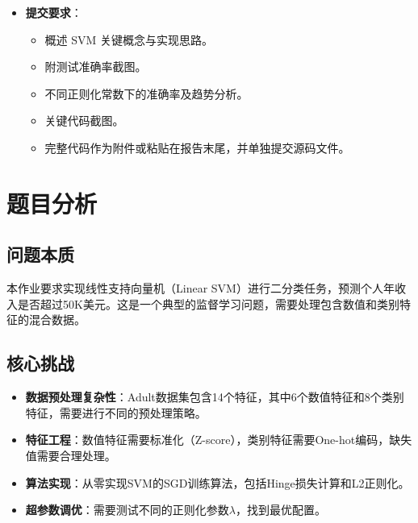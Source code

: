 \documentclass[a4paper]{article}
\begin{document}
{\begin{itemize}
\begin{itemize}
\[\begin{cases}
        - y_k, & \text{otherwise.}
        \end{cases}
        \]
        \item 实现时需加上 L2 正则项对 $a$ 的梯度贡献。
        \item SGD 训练需打乱样本，逐样本或小批量更新参数。
        \item 标签需映射为 $+1$（greater than 50K）和 $-1$（less than 50K）。
        \item 监控训练/验证损失与准确率，便于调参。
    \end{itemize}
    \item \textbf{提交要求}：
    \begin{itemize}
        \item 概述 SVM 关键概念与实现思路。
        \item 附测试准确率截图。
        \item 不同正则化常数下的准确率及趋势分析。
        \item 关键代码截图。
        \item 完整代码作为附件或粘贴在报告末尾，并单独提交源码文件。
    \end{itemize}
\end{itemize}
}

\section{题目分析}

\subsection{问题本质}
本作业要求实现线性支持向量机（Linear SVM）进行二分类任务，预测个人年收入是否超过50K美元。这是一个典型的监督学习问题，需要处理包含数值和类别特征的混合数据。

\subsection{核心挑战}
\begin{itemize}
    \item \textbf{数据预处理复杂性}：Adult数据集包含14个特征，其中6个数值特征和8个类别特征，需要进行不同的预处理策略。
    \item \textbf{特征工程}：数值特征需要标准化（Z-score），类别特征需要One-hot编码，缺失值需要合理处理。
    \item \textbf{算法实现}：从零实现SVM的SGD训练算法，包括Hinge损失计算和L2正则化。
    \item \textbf{超参数调优}：需要测试不同的正则化参数$\lambda$，找到最优配置。
\end{itemize}
\end{document}
